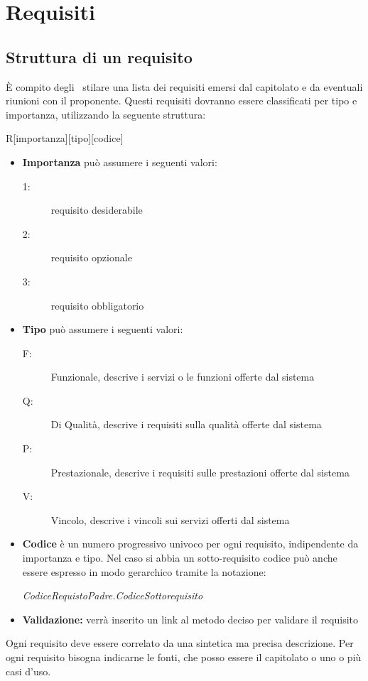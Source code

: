 \documentclass[12pt,a4paper]{article}
\begin{document}


\newpage
\section{Requisiti}
\subsection{Struttura di un requisito}
È compito degli \ANpl\ stilare una lista dei requisiti emersi dal capitolato e da eventuali riunioni con il proponente. Questi requisiti dovranno essere classificati per tipo e importanza, utilizzando la seguente struttura:
\begin{center}
	R[importanza][tipo][codice]
\end{center}
\begin{itemize}
	\item \textbf{Importanza} può assumere i seguenti valori:
	\begin{description}
		\item[1:] requisito desiderabile
		\item[2:] requisito opzionale
		\item[3:] requisito obbligatorio
	\end{description}
	\item \textbf{Tipo} può assumere i seguenti valori:
	\begin{description}
		\item[F:] Funzionale, descrive i servizi o le funzioni offerte dal sistema
		\item[Q:] Di Qualità, descrive i requisiti sulla qualità offerte dal sistema
		\item[P:] Prestazionale, descrive i requisiti sulle prestazioni offerte dal sistema
		\item[V:] Vincolo, descrive i vincoli sui servizi offerti dal sistema
	\end{description}
	\item \textbf{Codice} è un numero progressivo univoco per ogni requisito, indipendente da importanza e tipo. Nel caso si abbia un sotto-requisito codice può anche essere espresso in modo gerarchico tramite la notazione:
	\begin{center}
		\textit{CodiceRequistoPadre.CodiceSottorequisito}
	\end{center}
	\item \textbf{Validazione:} verrà inserito un link al metodo deciso per validare il requisito
\end{itemize}
Ogni requisito deve essere correlato da una sintetica ma precisa descrizione. Per ogni requisito bisogna indicarne le fonti, che posso essere il capitolato o uno o più casi d'uso.
\end{document}
